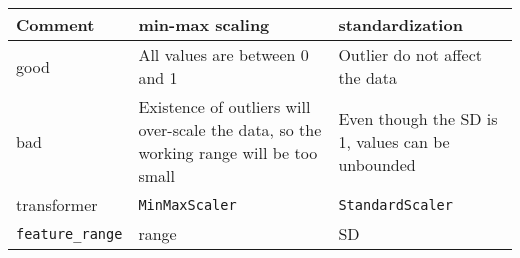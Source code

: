 \documentclass[11pt]{article}
\begin{document}
\begin{longtable}[]{@{}lll@{}}
\toprule
\begin{minipage}[b]{0.21\columnwidth}\raggedright
Comment\strut
\end{minipage} & \begin{minipage}[b]{0.42\columnwidth}\raggedright
min-max scaling\strut
\end{minipage} & \begin{minipage}[b]{0.29\columnwidth}\raggedright
standardization\strut
\end{minipage}\tabularnewline
\midrule
\endhead
\begin{minipage}[t]{0.21\columnwidth}\raggedright
good\strut
\end{minipage} & \begin{minipage}[t]{0.42\columnwidth}\raggedright
All values are between 0 and 1\strut
\end{minipage} & \begin{minipage}[t]{0.29\columnwidth}\raggedright
Outlier do not affect the data\strut
\end{minipage}\tabularnewline
\begin{minipage}[t]{0.21\columnwidth}\raggedright
bad\strut
\end{minipage} & \begin{minipage}[t]{0.42\columnwidth}\raggedright
Existence of outliers will over-scale the data, so the working range
will be too small\strut
\end{minipage} & \begin{minipage}[t]{0.29\columnwidth}\raggedright
Even though the SD is 1, values can be unbounded\strut
\end{minipage}\tabularnewline
\begin{minipage}[t]{0.21\columnwidth}\raggedright
transformer\strut
\end{minipage} & \begin{minipage}[t]{0.42\columnwidth}\raggedright
\texttt{MinMaxScaler}\strut
\end{minipage} & \begin{minipage}[t]{0.29\columnwidth}\raggedright
\texttt{StandardScaler}\strut
\end{minipage}\tabularnewline
\begin{minipage}[t]{0.21\columnwidth}\raggedright
\texttt{feature\_range}\strut
\end{minipage} & \begin{minipage}[t]{0.42\columnwidth}\raggedright
range\strut
\end{minipage} & \begin{minipage}[t]{0.29\columnwidth}\raggedright
SD\strut
\end{minipage}\tabularnewline
\bottomrule
\end{longtable}
\end{document}
